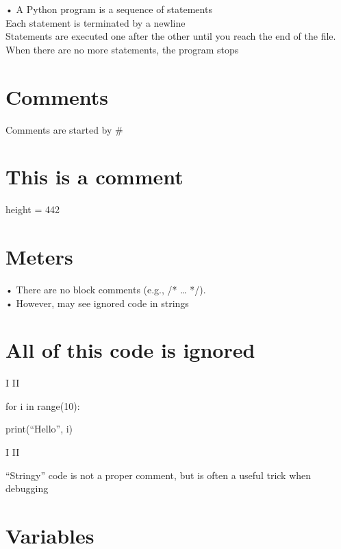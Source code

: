 \documentclass[
  letterpaper,
  DIV=11,
  numbers=noendperiod]{scrreprt}
\begin{document}
• A Python program is a sequence of statements\\
Each statement is terminated by a newline\\
Statements are executed one after the other until you reach the end of
the file.\\
When there are no more statements, the program stops


\chapter{Comments}\label{comments}

Comments are started by \#


\chapter{This is a comment}\label{this-is-a-comment}

height = 442


\chapter{Meters}\label{meters}

• There are no block comments (e.g., /* \ldots{} */).\\
• However, may see ignored code in strings


\chapter{All of this code is ignored}\label{all-of-this-code-is-ignored}

I II

for i in range(10):

print(``Hello'', i)

I II

``Stringy'' code is not a proper comment, but is often a useful trick
when debugging


\chapter{Variables}\label{variables}
\end{document}
